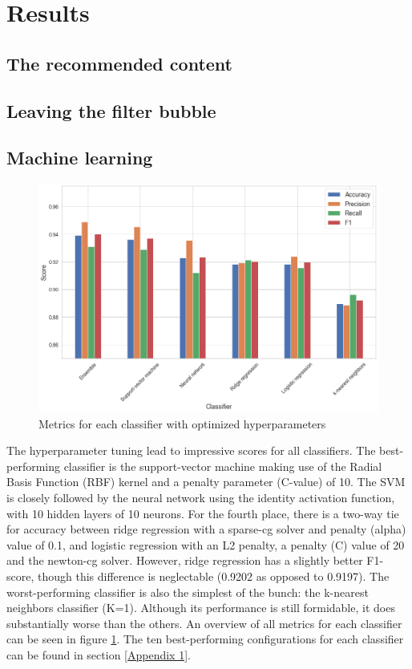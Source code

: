 \documentclass[../main.tex]{subfiles}
\begin{document}
\section{Results}

\subsection{The recommended content}

\subsection{Leaving the filter bubble}

\subsection{Machine learning}

\begin{figure}[t!]
  \centering
  \includegraphics[keepaspectratio, width=\textwidth]{images/classifier_results.png}
  \caption{Metrics for each classifier with optimized hyperparameters}
  \label{fig:ML_scores}
\end{figure}

The hyperparameter tuning lead to impressive scores for all classifiers. The best-performing classifier is the support-vector machine making use of the Radial Basis Function (RBF) kernel and a penalty parameter (C-value) of 10. The SVM is closely followed by the neural network using the identity activation function, with 10 hidden layers of 10 neurons. For the fourth place, there is a two-way tie for accuracy between ridge regression with a sparse-cg solver and penalty (alpha) value of 0.1, and logistic regression with an L2 penalty, a penalty (C) value of 20 and the newton-cg solver. However, ridge regression has a slightly better F1-score, though this difference is neglectable (0.9202 as opposed to 0.9197). The worst-performing classifier is also the simplest of the bunch: the k-nearest neighbors classifier (K=1). Although its performance is still formidable, it does substantially worse than the others. An overview of all metrics for each classifier can be seen in figure \ref{fig:ML_scores}. The ten best-performing configurations for each classifier can be found in section \ref{Appendix 1}.
\end{document}
